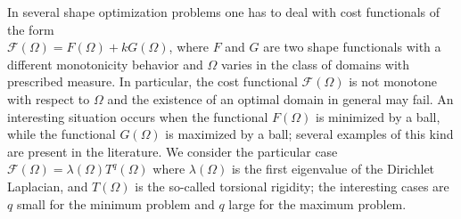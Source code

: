 \mypage
{}
\begin{myabstract}
In several shape optimization problems one has to deal with cost functionals of the form\\\relax
${\mathcal F}(\Omega)=F(\Omega)+kG(\Omega)$, where $F$ and $G$ are two shape functionals with a different monotonicity behavior and \protect $\Omega$ varies in the class of domains with prescribed measure. In particular, the cost functional \protect ${\mathcal F}(\Omega)$ is not monotone with respect to \protect $\Omega$ and the existence of an optimal domain in general may fail. An interesting situation occurs when the functional \protect $F(\Omega)$ is minimized by a ball, while the functional \protect $G(\Omega)$ is maximized by a ball; several examples of this kind are present in the literature. We consider the particular case \protect ${\mathcal F}(\Omega)=\lambda(\Omega)T^q(\Omega)$ where \protect $\lambda(\Omega)$ is the first eigenvalue of the Dirichlet Laplacian, and \protect $T(\Omega)$ is the so-called torsional rigidity; the interesting cases are \protect $q$ small for the minimum problem and \protect $q$ large for the maximum problem.
\end{myabstract}

